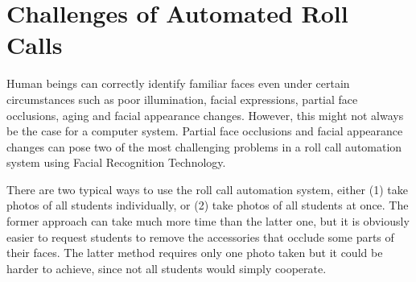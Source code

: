 \section{Challenges of Automated Roll Calls}
Human beings can correctly identify familiar faces even under certain circumstances such as poor illumination,
facial expressions, partial face occlusions, aging and facial appearance changes. However, this might not always
be the case for a computer system. Partial face occlusions and facial appearance changes can pose two of the most
challenging problems in a roll call automation system using Facial Recognition Technology.

There are two typical ways to use the roll call automation system, either (1) take photos of all students individually,
or (2) take photos of all students at once. The former approach can take much more time than the latter one, but it
is obviously easier to request students to remove the accessories that occlude some parts of their faces. The latter
method requires only one photo taken but it could be harder to achieve, since not all students would simply cooperate.
